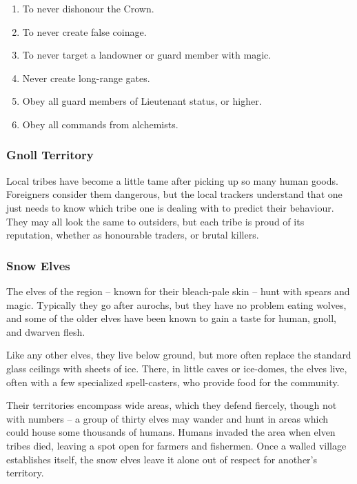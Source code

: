\begin{multicols}{2}
\begin{enumerate}
  \item
  To never dishonour the Crown.
  \item
  To never create false coinage.
  \item
  To never target a landowner or \gls{guard} member with magic.
  \item
  Never create long-range gates.
  \item
  Obey all \gls{guard} members of Lieutenant status, or higher.
  \item
  Obey all commands from \gls{alchemists}.

\end{enumerate}

\subsubsection{Gnoll Territory}

Local tribes have become a little tame after picking up so many human goods.
Foreigners consider them dangerous, but the local trackers understand that one just needs to know which tribe one is dealing with to predict their behaviour.
They may all look the same to outsiders, but each tribe is proud of its reputation, whether as honourable traders, or brutal killers.

\subsubsection{Snow Elves}

The elves of the region -- known for their bleach-pale skin -- hunt with spears and magic.
Typically they go after aurochs, but they have no problem eating wolves, and some of the older elves have been known to gain a taste for human, gnoll, and dwarven flesh.

Like any other elves, they live below ground, but more often replace the standard glass ceilings with sheets of ice.
There, in little caves or ice-domes, the elves live, often with a few specialized spell-casters, who provide food for the community.

Their territories encompass wide areas, which they defend fiercely, though not with numbers -- a group of thirty elves may wander and hunt in areas which could house some thousands of humans.
Humans invaded the area when elven tribes died, leaving a spot open for farmers and fishermen.
Once a walled village establishes itself, the snow elves leave it alone out of respect for another's territory.


\end{multicols}
